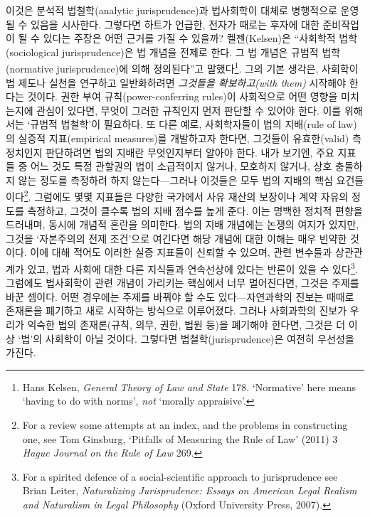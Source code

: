 \documentclass[12pt, oneside]{book}  %
\begin{document}
이것은 분석적 법철학(analytic jurisprudence)과 법사회학이 대체로
병행적으로 운영될 수 있음을 시사한다. 그렇다면 하트가 언급한, 전자가
때로는 후자에 대한 준비작업이 될 수 있다는 주장은 어떤 근거를 가질 수
있을까? 켈젠(Kelsen)은 ``사회학적 법학(sociological jurisprudence)은 법
개념을 전제로 한다. 그 법 개념은 규범적 법학(normative jurisprudence)에
의해 정의된다''고 말했다\footnote{Hans Kelsen, \emph{General Theory of
  Law and State} 178. `Normative' here means `having to do with norms',
  \emph{not} `morally appraisive'.}. 그의 기본 생각은, 사회학이 법
제도나 실천을 연구하고 일반화하려면 \emph{그것들을 확보하고(with them)}
시작해야 한다는 것이다. 권한 부여 규칙(power-conferring rules)이
사회적으로 어떤 영향을 미치는지에 관심이 있다면, 무엇이 그러한 규칙인지
먼저 판단할 수 있어야 한다. 이를 위해서는 `규범적 법철학'이 필요하다. 또
다른 예로, 사회학자들이 법의 지배(rule of law)의 실증적 지표(empirical
measures)를 개발하고자 한다면, 그것들이 유효한(valid) 측정치인지
판단하려면 법의 지배란 무엇인지부터 알아야 한다. 내가 보기엔, 주요
지표들 중 어느 것도 특정 관할권의 법이 소급적이지 않거나, 모호하지
않거나, 상호 충돌하지 않는 정도를 측정하려 하지 않는다---그러나 이것들은
모두 법의 지배의 핵심 요건들이다\footnote{For a review some attempts at
  an index, and the problems in constructing one, see Tom Ginsburg,
  `Pitfalls of Measuring the Rule of Law' (2011) 3 \emph{Hague Journal
  on the Rule of Law} 269.}. 그럼에도 몇몇 지표들은 다양한 국가에서 사유
재산의 보장이나 계약 자유의 정도를 측정하고, 그것이 클수록 법의 지배
점수를 높게 준다. 이는 명백한 정치적 편향을 드러내며, 동시에 개념적
혼란을 의미한다. 법의 지배 개념에는 논쟁의 여지가 있지만, 그것을
`자본주의의 전제 조건'으로 여긴다면 해당 개념에 대한 이해는 매우 빈약한
것이다. 이에 대해 적어도 이러한 실증 지표들이 신뢰할 수 있으며, 관련
변수들과 상관관계가 있고, 법과 사회에 대한 다른 지식들과 연속선상에
있다는 반론이 있을 수 있다\footnote{For a spirited defence of a
  social-scientific approach to jurisprudence see Brian Leiter,
  \emph{Naturalizing Jurisprudence: Essays on American Legal Realism and
  Naturalism in Legal Philosophy} (Oxford University Press, 2007).}.
그럼에도 법사회학이 관련 개념이 가리키는 핵심에서 너무 멀어진다면,
그것은 주제를 바꾼 셈이다. 어떤 경우에는 주제를 바꿔야 할 수도
있다---자연과학의 진보는 때때로 존재론을 폐기하고 새로 시작하는 방식으로
이루어졌다. 그러나 사회과학의 진보가 우리가 익숙한 법의 존재론(규칙,
의무, 권한, 법원 등)을 폐기해야 한다면, 그것은 더 이상 `법'의 사회학이
아닐 것이다. 그렇다면 법철학(jurisprudence)은 여전히 우선성을 가진다.
\end{document}
